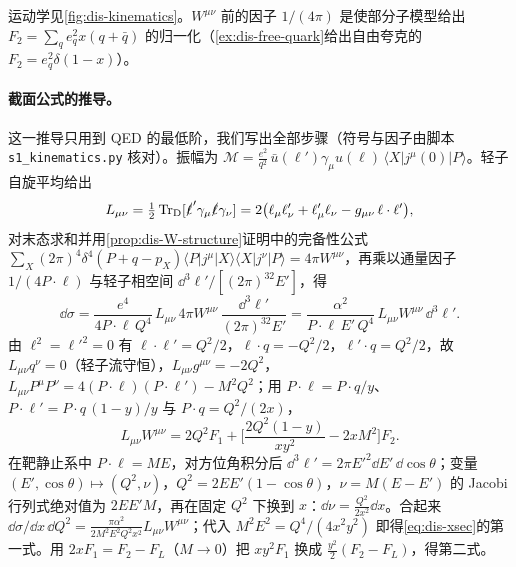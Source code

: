 运动学见\cref{fig:dis-kinematics}。$W^{\mu\nu}$ 前的因子 $1/(4\pi)$ 是使部分子模型给出 $F_2=\sum_qe_q^2x(q+\bar q)$ 的归一化（\cref{ex:dis-free-quark}给出自由夸克的 $F_2=e_q^2\delta(1-x)$）。

\paragraph{截面公式的推导。}这一推导只用到 QED 的最低阶，我们写出全部步骤（符号与因子由脚本 \texttt{s1\_kinematics.py} 核对）。振幅为 $\mathcal M=\frac{e^2}{q^2}\,\bar u(\ell')\gamma_\mu u(\ell)\,\langle X|j^\mu(0)|P\rangle$。轻子自旋平均给出
\[
L_{\mu\nu}=\tfrac12\operatorname{Tr}_{\mathrm{D}}[\slashed{\ell}'\gamma_\mu\slashed{\ell}\gamma_\nu]=2\big(\ell_\mu\ell'_\nu+\ell'_\mu\ell_\nu-g_{\mu\nu}\,\ell\cdot\ell'\big),
\]
对末态求和并用\cref{prop:dis-W-structure}证明中的完备性公式 $\sum_X(2\pi)^4\delta^4(P+q-p_X)\langle P|j^\mu|X\rangle\langle X|j^\nu|P\rangle=4\pi W^{\mu\nu}$，再乘以通量因子 $1/(4P\cdot\ell)$ 与轻子相空间 $\dd^3\ell'/[(2\pi)^32E']$，得
\[
\dd\sigma=\frac{e^4}{4P\cdot\ell\,Q^4}\,L_{\mu\nu}\,4\pi W^{\mu\nu}\,\frac{\dd^3\ell'}{(2\pi)^32E'}=\frac{\alpha^2}{P\cdot\ell\,E'\,Q^4}\,L_{\mu\nu}W^{\mu\nu}\,\dd^3\ell' .
\]
由 $\ell^2=\ell'^2=0$ 有 $\ell\cdot\ell'=Q^2/2$，$\ell\cdot q=-Q^2/2$，$\ell'\cdot q=Q^2/2$，故 $L_{\mu\nu}q^\nu=0$（轻子流守恒），$L_{\mu\nu}g^{\mu\nu}=-2Q^2$，$L_{\mu\nu}P^\mu P^\nu=4(P\cdot\ell)(P\cdot\ell')-M^2Q^2$；用 $P\cdot\ell=P\cdot q/y$、$P\cdot\ell'=P\cdot q\,(1-y)/y$ 与 $P\cdot q=Q^2/(2x)$，
\[
L_{\mu\nu}W^{\mu\nu}=2Q^2F_1+\Big[\frac{2Q^2(1-y)}{xy^2}-2xM^2\Big]F_2 .
\]
在靶静止系中 $P\cdot\ell=ME$，对方位角积分后 $\dd^3\ell'=2\pi E'^2\dd E'\,\dd\cos\theta$；变量 $(E',\cos\theta)\mapsto(Q^2,\nu)$，$Q^2=2EE'(1-\cos\theta)$，$\nu=M(E-E')$ 的 Jacobi 行列式绝对值为 $2EE'M$，再在固定 $Q^2$ 下换到 $x$：$\dd\nu=\frac{Q^2}{2x^2}\dd x$。合起来 $\dd\sigma/\dd x\,\dd Q^2=\frac{\pi\alpha^2}{2M^2E^2Q^2x^2}L_{\mu\nu}W^{\mu\nu}$；代入 $M^2E^2=Q^4/(4x^2y^2)$ 即得\cref{eq:dis-xsec}的第一式。用 $2xF_1=F_2-F_L$（$M\to0$）把 $xy^2F_1$ 换成 $\frac{y^2}2(F_2-F_L)$，得第二式。

